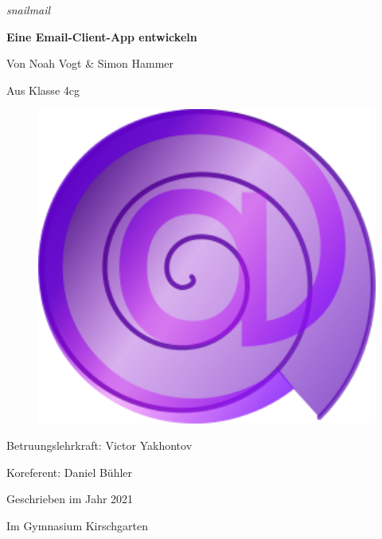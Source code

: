 \documentclass[a4paper,11pt]{article}
\begin{document}
\begin{titlepage}

	\centering
	
    {\slshape\large snailmail \par}
    \vspace{0.1cm}
	{\huge\bfseries Eine Email-Client-App entwickeln \par}
	\vspace{0.5cm}
	{\Large Von Noah Vogt \& Simon Hammer \par}
    {\Large Aus Klasse 4cg \par}
    \vspace{0.5cm}
   
    \begin{figure}[H]
        \centering
        \includegraphics[width=1\textwidth]{../logo/version3d.png}
    \end{figure}
   
    \vspace{0.5cm}
    {\Large Betruungslehrkraft: Victor Yakhontov \par }
    {\Large Koreferent: Daniel Bühler \par}
    \vspace{0.5cm}
	{\large Geschrieben im Jahr 2021 \par}
    {\large Im Gymnasium Kirschgarten \par}
	
\end{titlepage}
\end{document}
